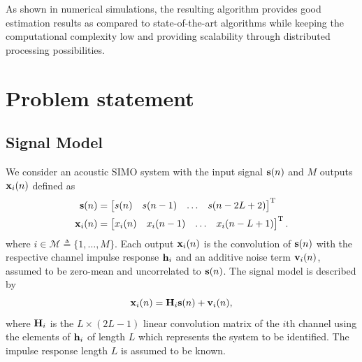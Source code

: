 \documentclass{article}
\newcommand{\h}{\mtxb{h}}
\newcommand{\x}{\mtxb{x}}
\newcommand{\Mset}{\mathcal{M}}
\begin{document}
As shown in numerical simulations, the resulting algorithm provides good estimation results as compared to state-of-the-art algorithms while keeping the computational complexity low and providing scalability through distributed processing possibilities.

\section{Problem statement}
\label{sec:problem_statement}


\subsection{Signal Model}
\label{ssec:signal_model}
We consider an acoustic SIMO system with the input signal \(\bm{\mathrm{s}}(n)\) and \(M\) outputs \(\x_i(n)\) defined as
\begin{align}
    \mtxb{s}(n) &= \begin{bmatrix}
        s(n)&s(n-1)&\ldots&s(n-2L+2)
    \end{bmatrix}^{\T}\\
    \x_i(n) &= \begin{bmatrix}
        x_i(n)&x_i(n-1)&\ldots&x_i(n-L+1)
    \end{bmatrix}^{\T}.
\end{align}
where \(i \in \Mset \triangleq \{1,\ldots,M\} \).
Each output \(\x_i(n)\) is the convolution of \(\bm{\mathrm{s}}(n)\) with the respective channel impulse response \(\h_i\) and an additive noise term \(\bm{\mathrm{v}}_i(n)\), assumed to be zero-mean and uncorrelated to \(\bm{\mathrm{s}}(n)\).
The signal model is described by
\begin{equation}
    \x_i(n) = \mtxb{H}_i \mtxb{s}(n) + \mtxb{v}_i(n),
\end{equation}
where \(\bm{\mathrm{H}}_i\) is the \(L \times (2L-1)\) linear convolution matrix of the \(i\)th channel using the elements of \(\h_i\) of length \(L\) which represents the system to be identified.
The impulse response length \(L\) is assumed to be known.

\end{document}
